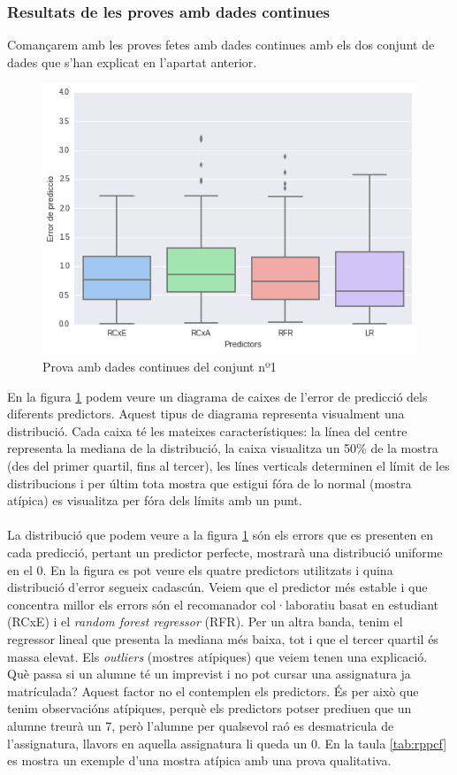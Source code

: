\documentclass[12pt,a4paper,catalan]{article}
\begin{document}
\subsubsection{Resultats de les proves amb dades continues}
Comançarem amb les proves fetes amb dades continues amb els dos conjunt de dades que s'han explicat en l'apartat anterior.
\\
\begin{figure}[h]
\centering
\includegraphics[width=.7\linewidth]{img/boxplot_primer_segon.png}
\caption{Prova amb dades continues del conjunt nº1}
\label{fig:boxplotdctp}
\end{figure}

En la figura \ref{fig:boxplotdctp} podem veure un diagrama de caixes de l'error de predicció dels diferents predictors. Aquest tipus de diagrama representa visualment una distribució. Cada caixa té les mateixes característiques: la línea del centre representa la mediana de la distribució, la caixa visualitza un 50\% de la mostra (des del primer quartil, fins al tercer), les línes verticals determinen el límit de les distribucions i per últim tota mostra que estigui fóra de lo normal (mostra atípica) es visualitza per fóra dels límits amb un punt.
\\
\\
La distribució que podem veure a la figura \ref{fig:boxplotdctp} són els errors que es presenten en cada predicció, pertant un predictor perfecte, mostrarà una distribució uniforme en el 0. En la figura es pot veure els quatre predictors utilitzats i quina distribució d'error segueix cadascún. Veiem que el predictor més estable i que concentra millor els errors són el recomanador col·laboratiu basat en estudiant (RCxE) i el \textit{random forest regressor} (RFR). Per un altra banda, tenim el regressor lineal que presenta la mediana més baixa, tot i que el tercer quartil és massa elevat. Els \textit{outliers} (mostres atípiques) que veiem tenen una explicació. Què passa si un alumne té un imprevist i no pot cursar una assignatura ja matrículada? Aquest factor no el contemplen els predictors. És per això que tenim observacións atípiques, perquè els predictors potser prediuen que un alumne treurà un 7, però l'alumne per qualsevol raó es desmatricula de l'assignatura, llavors en aquella assignatura li queda un 0. En la taula \ref{tab:rppcf} es mostra un exemple d'una mostra atípica amb una prova qualitativa.
\end{document}
